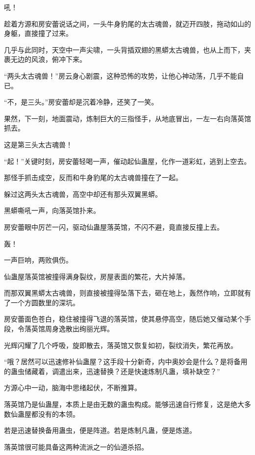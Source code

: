 
\begin{this_body}

吼！

趁着方源和房安蕾说话之间，一头牛身豹尾的太古魂兽，就迈开四肢，拖动如山的身躯，直接撞了过来。

几乎与此同时，天空中一声尖啸，一头背插双翅的黑蟒太古魂兽，也从上而下，夹裹无边的风浪，俯冲下来。

“两头太古魂兽！”房云身心剧震，这种恐怖的攻势，让他心神动荡，几乎不能自已。

“不，是三头。”房安蕾却是沉着冷静，还笑了一笑。

果然，下一刻，地面震动，炼制巨大的三指怪手，从地底冒出，一左一右向落英馆抓去。

这是第三头太古魂兽！

“起！”关键时刻，房安蕾轻喝一声，催动起仙蛊屋，化作一道彩虹，逃到上空去。

那怪手抓击成空，反而和牛身豹尾的太古魂兽撞在了一起。

躲过这两头太古魂兽，高空中却还有那头双翼黑蟒。

黑蟒嘶吼一声，向落英馆扑来。

房安蕾眼中厉芒一闪，驱动仙蛊屋落英馆，不闪不避，竟直接反撞上去。

轰！

一声巨响，两败俱伤。

仙蛊屋落英馆被撞得满身裂纹，房屋表面的繁花，大片掉落。

而那双翼黑蟒太古魂兽，则直接被撞得坠落下去，砸在地上，轰然作响，立即就有了一个方圆数里的深坑。

房安蕾面色苍白，稳住被撞得飞退的落英馆，使其悬停高空，随后她又催动某个手段，令落英馆周身逸散出绚丽光辉。

光辉闪耀了几个呼吸，旋即散去，落英馆又恢复如初，裂纹消失，繁花再放。

“哦？居然可以迅速修补仙蛊屋？这手段十分新奇，内中奥妙会是什么？是将备用的蛊虫储藏着，调遣出来，迅速替换？还是快速炼制凡蛊，填补缺空？”

方源心中一动，脑海中思绪起伏，不断推算。

落英馆乃是仙蛊屋，本质上是由无数的蛊虫构成。能够迅速自行修复，这是绝大多数仙蛊屋都没有的本领。

若是迅速替换备用蛊虫，便是阵道。若是炼制凡蛊，便是炼道。

落英馆很可能具备这两种流派之一的仙道杀招。


\end{this_body}
